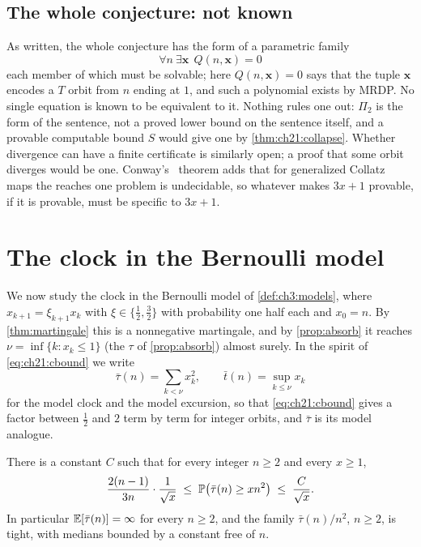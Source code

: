 \subsection{The whole conjecture: not known}

As written, the whole conjecture has the form of a parametric family
\[
\forall n\ \exists \mathbf x\ \ Q(n,\mathbf x)=0
\]
each member of which must be solvable; here $Q(n,\mathbf x)=0$ says that the tuple $\mathbf x$ encodes a $T$ orbit from $n$ ending at $1$, and such a polynomial exists by MRDP. No single equation is known to be equivalent to it. Nothing rules one out: $\Pi_2$ is the form of the sentence, not a proved lower bound on the sentence itself, and a provable computable bound $S$ would give one by \cref{thm:ch21:collapse}. Whether divergence can have a finite certificate is similarly open; a proof that some orbit diverges would be one. Conway's~\cite{conway1972} theorem adds that for generalized Collatz maps the reaches one problem is undecidable, so whatever makes $3x+1$ provable, if it is provable, must be specific to $3x+1$.

\section{The clock in the Bernoulli model}\label{sec:ch21:clock}

We now study the clock in the Bernoulli model of \cref{def:ch3:models}, where $x_{k+1}=\xi_{k+1}x_k$ with $\xi\in\{\tfrac12,\tfrac32\}$ with probability one half each and $x_0=n$. By \cref{thm:martingale} this is a nonnegative martingale, and by \cref{prop:absorb} it reaches $\nu=\inf\{k:x_k\le1\}$ (the $\tau$ of \cref{prop:absorb}) almost surely. In the spirit of \eqref{eq:ch21:cbound} we write
\[
\bar\tau(n)=\sum_{k<\nu}x_k^2,\qquad \bar t(n)=\sup_{k\le\nu}x_k
\]
for the model clock and the model excursion, so that \eqref{eq:ch21:cbound} gives a factor between $\tfrac12$ and $2$ term by term for integer orbits, and $\bar\tau$ is its model analogue.

\begin{theorem}\label{thm:ch21:tail}
There is a constant $C$ such that for every integer $n\ge2$ and every $x\ge1$,
\[
\frac{2(n-1)}{3n}\cdot\frac1{\sqrt x}\;\le\;\mathbb{P}\bigl(\bar\tau(n)\ge xn^2\bigr)\;\le\;\frac{C}{\sqrt x}.
\]
In particular $\mathbb{E}[\bar\tau(n)]=\infty$ for every $n\ge2$, and the family $\bar\tau(n)/n^2$, $n\ge2$, is tight, with medians bounded by a constant free of $n$.
\end{theorem}

